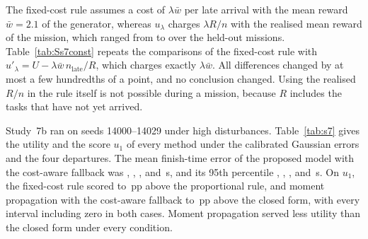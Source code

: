 The fixed-cost rule assumes a cost of $\lambda\bar w$ per late arrival with the mean reward $\bar w=2.1$ of the
generator, whereas $u_\lambda$ charges $\lambda R/n$ with the realised mean reward of the mission, which ranged from
 to  over the held-out missions. Table~\ref{tab:Ss7const} repeats the comparisons of the
fixed-cost rule with $u'_\lambda=U-\lambda\bar w\,n_{\mathrm{late}}/R$, which charges exactly $\lambda\bar w$. All
differences changed by at most a few hundredths of a point, and no conclusion changed. Using the realised $R/n$ in the
rule itself is not possible during a mission, because $R$ includes the tasks that have not yet arrived.


Study~7b ran on seeds 14000--14029 under high disturbances. Table~\ref{tab:s7} gives the utility and the score $u_1$ of
every method under the calibrated Gaussian errors and the four departures. The mean finish-time error of the proposed
model with the cost-aware fallback was , , ,  and
\,s, and its 95th percentile , , ,
 and \,s. On $u_1$, the fixed-cost rule scored  to
\,pp above the proportional rule, and moment propagation with the cost-aware fallback
 to \,pp above the closed form, with every interval including zero in
both cases. Moment propagation served less utility than the closed form under every condition.

